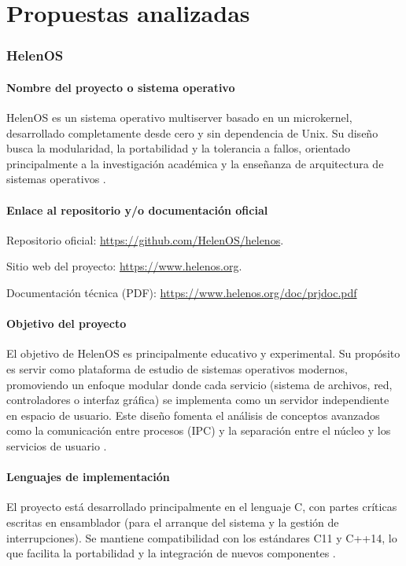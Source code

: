\chapter{Propuestas analizadas}

\subsection{HelenOS}

\subsubsection{Nombre del proyecto o sistema operativo}
HelenOS es un sistema operativo multiserver basado en un microkernel, desarrollado completamente desde cero y sin dependencia de Unix. Su diseño busca la modularidad, la portabilidad y la tolerancia a fallos, orientado principalmente a la investigación académica y la enseñanza de arquitectura de sistemas operativos \cite{helenos_about}.

\subsubsection{Enlace al repositorio y/o documentación oficial}
Repositorio oficial: \url{https://github.com/HelenOS/helenos}.

Sitio web del proyecto: \url{https://www.helenos.org}.

Documentación técnica (PDF): \url{https://www.helenos.org/doc/prjdoc.pdf}

\subsubsection{Objetivo del proyecto}
El objetivo de HelenOS es principalmente educativo y experimental. Su propósito es servir como plataforma de estudio de sistemas operativos modernos, promoviendo un enfoque modular donde cada servicio (sistema de archivos, red, controladores o interfaz gráfica) se implementa como un servidor independiente en espacio de usuario. Este diseño fomenta el análisis de conceptos avanzados como la comunicación entre procesos (IPC) y la separación entre el núcleo y los servicios de usuario \cite{helenos_about, helenos_prjdoc}.

\subsubsection{Lenguajes de implementación}
El proyecto está desarrollado principalmente en el lenguaje C, con partes críticas escritas en ensamblador (para el arranque del sistema y la gestión de interrupciones). Se mantiene compatibilidad con los estándares C11 y C++14, lo que facilita la portabilidad y la integración de nuevos componentes \cite{helenos_prjdoc}.

